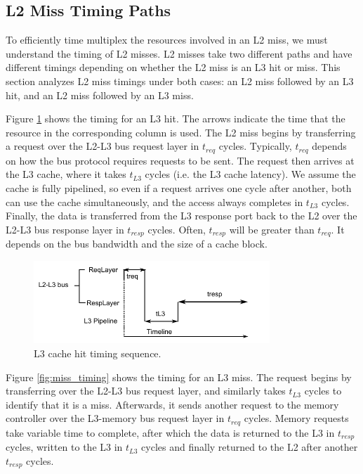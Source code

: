 \subsection{L2 Miss Timing Paths}
To efficiently time multiplex the resources involved in an L2 miss, 
we must understand the timing of L2 misses. L2 misses take two different 
paths and have different timings depending on whether the L2 miss is an L3 hit 
or miss. This section analyzes L2 miss timings under both cases: an L2 miss
followed by an L3 hit, and an L2 miss followed by an L3 miss.

Figure \ref{fig:hit_timing} shows the timing for an L3 hit. The arrows 
indicate the time that the resource in the corresponding column is used.
The L2 miss begins by transferring a request over the L2-L3 bus request layer 
in $t_{req}$ cycles. Typically, $t_{req}$ depends on how the bus protocol 
requires requests to be sent. The request then arrives at the L3 cache, where 
it takes $t_{L3}$ cycles (i.e. the L3 cache latency). We assume the cache is 
fully pipelined, so even if a request arrives one cycle after another, both can 
use the cache simultaneously, and the access always completes in $t_{L3}$ 
cycles. Finally, the data is transferred from the L3 response port back to the 
L2 over the L2-L3 bus response layer in $t_{resp}$ cycles. Often, $t_{resp}$ 
will be greater than $t_{req}$. It depends on the bus bandwidth and the size of 
a cache block.

\begin{figure}
    \begin{center}
        \includegraphics[width=3.5in]{figs/hit_timing.pdf}
        \caption{L3 cache hit timing sequence.}
        \label{fig:hit_timing}
    \end{center}
\end{figure}

Figure \ref{fig:miss_timing} shows the timing for an L3 miss. The request 
begins by transferring over the L2-L3 bus request layer, and similarly takes 
$t_{L3}$ cycles to identify that it is a miss. Afterwards, it sends another 
request to the memory controller over the L3-memory bus request layer in 
$t_{req}$ cycles. Memory requests take variable time to complete, after which 
the data is returned to the L3 in $t_{resp}$ cycles, written to the L3 in 
$t_{L3}$ cycles and finally returned to the L2 after another $t_{resp}$ cycles.

